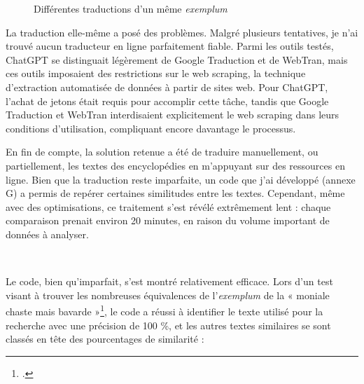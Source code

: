 \begin{figure}[H]
	\centering
	\caption{Différentes traductions d'un même \textit{exemplum}}
\end{figure} 

La traduction elle-même a posé des problèmes. Malgré plusieurs tentatives, je n'ai trouvé aucun traducteur en ligne parfaitement fiable. Parmi les outils testés, ChatGPT se distinguait légèrement de Google Traduction et de WebTran, mais ces outils imposaient des restrictions sur le web scraping, la technique d'extraction automatisée de données à partir de sites web. Pour ChatGPT, l'achat de jetons était requis pour accomplir cette tâche, tandis que Google Traduction et WebTran interdisaient explicitement le web scraping dans leurs conditions d'utilisation, compliquant encore davantage le processus.

En fin de compte, la solution retenue a été de traduire manuellement, ou partiellement, les textes des encyclopédies en m'appuyant sur des ressources en ligne. Bien que la traduction reste imparfaite, un code que j'ai développé (annexe G) a permis de repérer certaines similitudes entre les textes. Cependant, même avec des optimisations, ce traitement s'est révélé extrêmement lent : chaque comparaison prenait environ 20 minutes, en raison du volume important de données à analyser.

\

Le code, bien qu'imparfait, s'est montré relativement efficace. Lors d'un test visant à trouver les nombreuses équivalences de l'\textit{exemplum} de la « moniale chaste mais bavarde »\footcite{RecitsExemplairesMoniale}, le code a réussi à identifier le texte utilisé pour la recherche avec une précision de 100 \%, et les autres textes similaires se sont classés en tête des pourcentages de similarité :

